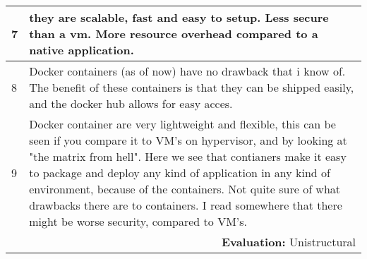 \begin{longtable}{|p{0.3cm}|p{14.7cm}|}
7 & they are scalable, fast and easy to setup. Less secure than a vm. More resource overhead compared to a native application. \\ \hline

8 & Docker containers (as of now) have no drawback that i know of. The benefit of these containers is that they can be shipped easily, and the docker hub allows for easy acces.     \\ \hline

9 & Docker container are very lightweight and flexible, this can be seen if you compare it to VM's on hypervisor, and by looking at "the matrix from hell". Here we see that contianers make it easy to package and deploy any kind of application in any kind of environment, because of the containers. Not quite sure of what drawbacks there are to containers. I read somewhere that there might be worse security, compared to VM's. \\ \hline

\multicolumn{2}{r}{\textbf{Evaluation:} Unistructural} \\ 
\end{longtable}
\normalsize

